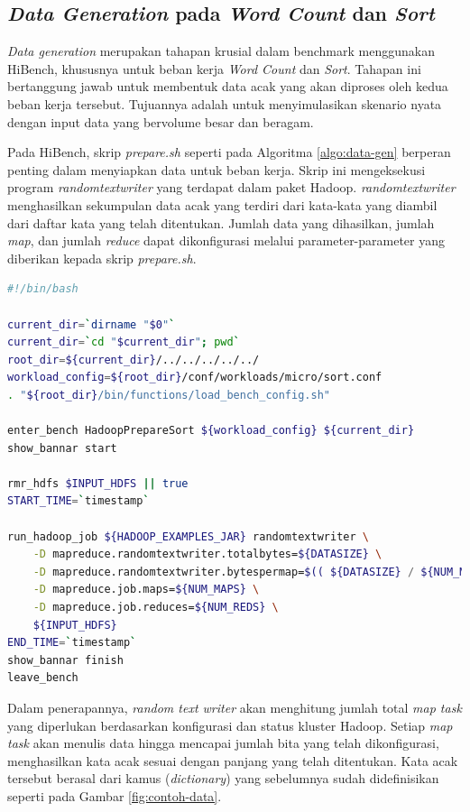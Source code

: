 \subsection{\textit{Data Generation} pada \textit{Word Count} dan \textit{Sort}}
\textit{Data generation} merupakan tahapan krusial dalam benchmark menggunakan HiBench, khususnya untuk beban kerja \textit{Word Count} dan \textit{Sort}. Tahapan ini bertanggung jawab untuk membentuk data acak yang akan diproses oleh kedua beban kerja tersebut. Tujuannya adalah untuk menyimulasikan skenario nyata dengan input data yang bervolume besar dan beragam.

Pada HiBench, skrip \textit{prepare.sh} seperti pada Algoritma \ref{algo:data-gen} berperan penting dalam menyiapkan data untuk beban kerja. Skrip ini mengeksekusi program \textit{randomtextwriter} yang terdapat dalam paket Hadoop. \textit{randomtextwriter} menghasilkan sekumpulan data acak yang terdiri dari kata-kata yang diambil dari daftar kata yang telah ditentukan. Jumlah data yang dihasilkan, jumlah \textit{map}, dan jumlah \textit{reduce} dapat dikonfigurasi melalui parameter-parameter yang diberikan kepada skrip \textit{prepare.sh}.

\begin{lstlisting}[language=bash, caption=Skrip yang Digunakan HiBench pada Tahap \textit{Data Generation}, label=algo:data-gen]
#!/bin/bash

current_dir=`dirname "$0"`
current_dir=`cd "$current_dir"; pwd`
root_dir=${current_dir}/../../../../../
workload_config=${root_dir}/conf/workloads/micro/sort.conf
. "${root_dir}/bin/functions/load_bench_config.sh"

enter_bench HadoopPrepareSort ${workload_config} ${current_dir}
show_bannar start

rmr_hdfs $INPUT_HDFS || true
START_TIME=`timestamp`

run_hadoop_job ${HADOOP_EXAMPLES_JAR} randomtextwriter \
    -D mapreduce.randomtextwriter.totalbytes=${DATASIZE} \
    -D mapreduce.randomtextwriter.bytespermap=$(( ${DATASIZE} / ${NUM_MAPS} )) \
    -D mapreduce.job.maps=${NUM_MAPS} \
    -D mapreduce.job.reduces=${NUM_REDS} \
    ${INPUT_HDFS}
END_TIME=`timestamp`
show_bannar finish
leave_bench
\end{lstlisting}

Dalam penerapannya, \textit{random text writer} akan menghitung jumlah total \textit{map task} yang diperlukan berdasarkan konfigurasi dan status kluster Hadoop. Setiap \textit{map task} akan menulis data hingga mencapai jumlah bita yang telah dikonfigurasi, menghasilkan kata acak sesuai dengan panjang yang telah ditentukan. Kata acak tersebut berasal dari kamus (\textit{dictionary}) yang sebelumnya sudah didefinisikan seperti pada Gambar \ref{fig:contoh-data}.

